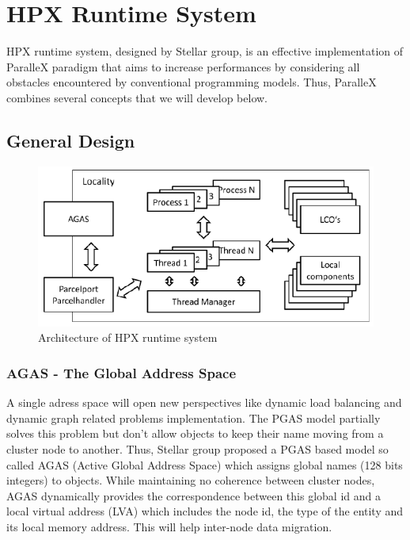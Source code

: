 \documentclass{llncs}
\begin{document}
\section{HPX Runtime System}\label{HPX}
HPX runtime system, designed by Stellar group, is an effective implementation of ParalleX paradigm that aims to increase performances by considering all obstacles encountered by conventional programming models. Thus, ParalleX combines several concepts that we will develop below.

\subsection{General Design}

\begin{figure}[h]
\begin{center}
\includegraphics[scale=0.55]{Images/Im4.png}
\end{center}
\caption{Architecture of HPX runtime system}
\label{ArchiHPX}
\end{figure}

\subsubsection{AGAS - The Global Address Space}
A single adress space will open new perspectives like dynamic load balancing and dynamic graph related problems implementation. The PGAS model \cite{PGAS} partially solves this problem but don't allow objects to keep their name moving from a cluster node to another. Thus, Stellar group proposed a PGAS based model so called AGAS (Active Global Address Space) \cite{ParalleX} which assigns
global names (128 bits integers) to objects. While maintaining no coherence between cluster nodes, AGAS dynamically provides the correspondence between this global id and a local virtual address (LVA) \cite{ParalleX} which includes the node id, the type of the entity and its local memory address. This will help inter-node data migration.
\end{document}
